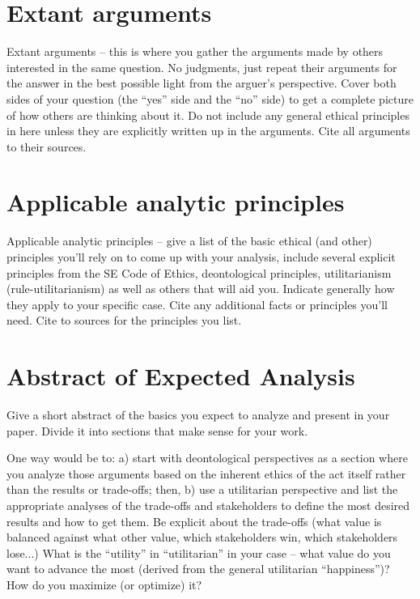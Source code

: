 \documentclass[12pt]{article}
\begin{document}
\section{Extant arguments}
Extant arguments -- this is where you gather the arguments made by others interested in the same question. No judgments, just repeat their arguments for the answer in the best possible light from the arguer's perspective. Cover both sides of your question (the ``yes'' side and the ``no'' side) to get a complete picture of how others are thinking about it. Do not include any general ethical principles in here unless they are explicitly written up in the arguments. Cite all arguments to their sources. \cite{handout}

\section{Applicable analytic principles}
Applicable analytic principles -- give a list of the basic ethical (and other) principles you'll rely on to come up with your analysis, include several explicit principles from the SE Code of Ethics, deontological principles, utilitarianism (rule-utilitarianism) as well as others that will aid you. Indicate generally how they apply to your specific case. Cite any additional facts or principles you'll need. Cite to sources for the principles you list. \cite{handout}

\section{Abstract of Expected Analysis}
Give a short abstract of the basics you expect to analyze and present in your paper. Divide it into sections that make sense for your work.

One way would be to: a) start with deontological perspectives as a section where you analyze those arguments based on the inherent ethics of the act itself rather than the results or trade-offs; then, b) use a utilitarian perspective and list the appropriate analyses of the trade-offs and stakeholders to define the most desired results and how to get them. Be explicit about the trade-offs (what value is balanced against what other value, which stakeholders win, which stakeholders lose...) What is the ``utility'' in ``utilitarian'' in your case -- what value do you want to advance the most (derived from the general utilitarian ``happiness'')? How do you maximize (or optimize) it?
\end{document}
